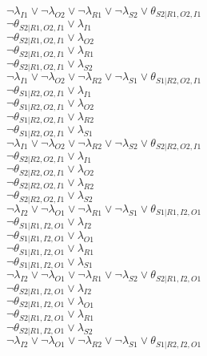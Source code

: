 $\neg\lambda_{I1} \vee \neg\lambda_{O2} \vee \neg\lambda_{R1} \vee \neg\lambda_{S2} \vee \theta_{S2|R1,O2,I1}$\\
$\neg\theta_{S2|R1,O2,I1} \vee \lambda_{I1}$\\
$\neg\theta_{S2|R1,O2,I1} \vee \lambda_{O2}$\\
$\neg\theta_{S2|R1,O2,I1} \vee \lambda_{R1}$\\
$\neg\theta_{S2|R1,O2,I1} \vee \lambda_{S2}$\\
$\neg\lambda_{I1} \vee \neg\lambda_{O2} \vee \neg\lambda_{R2} \vee \neg\lambda_{S1} \vee \theta_{S1|R2,O2,I1}$\\
$\neg\theta_{S1|R2,O2,I1} \vee \lambda_{I1}$\\
$\neg\theta_{S1|R2,O2,I1} \vee \lambda_{O2}$\\
$\neg\theta_{S1|R2,O2,I1} \vee \lambda_{R2}$\\
$\neg\theta_{S1|R2,O2,I1} \vee \lambda_{S1}$\\
$\neg\lambda_{I1} \vee \neg\lambda_{O2} \vee \neg\lambda_{R2} \vee \neg\lambda_{S2} \vee \theta_{S2|R2,O2,I1}$\\
$\neg\theta_{S2|R2,O2,I1} \vee \lambda_{I1}$\\
$\neg\theta_{S2|R2,O2,I1} \vee \lambda_{O2}$\\
$\neg\theta_{S2|R2,O2,I1} \vee \lambda_{R2}$\\
$\neg\theta_{S2|R2,O2,I1} \vee \lambda_{S2}$\\
$\neg\lambda_{I2} \vee \neg\lambda_{O1} \vee \neg\lambda_{R1} \vee \neg\lambda_{S1} \vee \theta_{S1|R1,I2,O1}$\\
$\neg\theta_{S1|R1,I2,O1} \vee \lambda_{I2}$\\
$\neg\theta_{S1|R1,I2,O1} \vee \lambda_{O1}$\\
$\neg\theta_{S1|R1,I2,O1} \vee \lambda_{R1}$\\
$\neg\theta_{S1|R1,I2,O1} \vee \lambda_{S1}$\\
$\neg\lambda_{I2} \vee \neg\lambda_{O1} \vee \neg\lambda_{R1} \vee \neg\lambda_{S2} \vee \theta_{S2|R1,I2,O1}$\\
$\neg\theta_{S2|R1,I2,O1} \vee \lambda_{I2}$\\
$\neg\theta_{S2|R1,I2,O1} \vee \lambda_{O1}$\\
$\neg\theta_{S2|R1,I2,O1} \vee \lambda_{R1}$\\
$\neg\theta_{S2|R1,I2,O1} \vee \lambda_{S2}$\\
$\neg\lambda_{I2} \vee \neg\lambda_{O1} \vee \neg\lambda_{R2} \vee \neg\lambda_{S1} \vee \theta_{S1|R2,I2,O1}$\\
